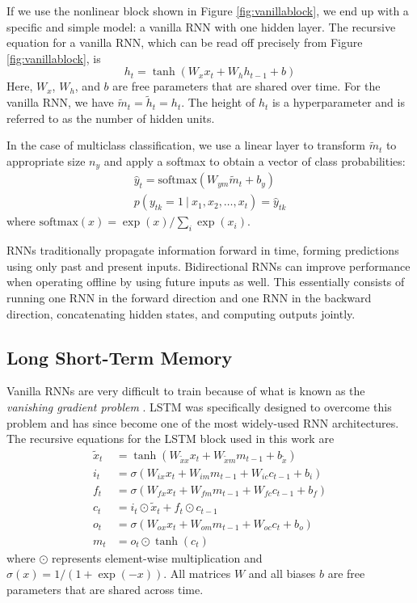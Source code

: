 \documentclass{llncs}
\begin{document}
If we use the nonlinear block shown in Figure \ref{fig:vanillablock}, we end up with a specific and simple model: a vanilla RNN with one hidden layer. The recursive equation for a vanilla RNN, which can be read off precisely from Figure \ref{fig:vanillablock}, is
\begin{equation}
	h_t = \tanh(W_x x_t + W_h h_{t-1} + b) \label{eq:vanillarnn}
\end{equation}
Here, $W_x$, $W_h$, and $b$ are free parameters that are shared over time. For the vanilla RNN, we have $\tilde{m}_t = \tilde{h}_t = h_t$. The height of $h_t$ is a hyperparameter and is referred to as the number of hidden units.

In the case of multiclass classification, we use a linear layer to transform $\tilde{m}_t$ to appropriate size $n_y$ and apply a softmax to obtain a vector of class probabilities:
\begin{gather}
	\hat{y}_t = \mbox{softmax}(W_{ym} \tilde{m}_t + b_y) \label{eq:logits} \\
	p(y_{tk} = 1~|~x_1, x_2, \ldots, x_t) = \hat{y}_{tk} \label{eq:prob}
\end{gather}
where $\mbox{softmax}(x) = \exp(x) \label{eq:softmax} / \sum_i \exp(x_i)$.

RNNs traditionally propagate information forward in time, forming predictions using only past and present inputs. Bidirectional RNNs \cite{schuster1997bidirectional} can improve performance when operating offline by using future inputs as well. This essentially consists of running one RNN in the forward direction and one RNN in the backward direction, concatenating hidden states, and computing outputs jointly.

\subsection{Long Short-Term Memory}

Vanilla RNNs are very difficult to train because of what is known as the \emph{vanishing gradient problem} \cite{bengio1994learning}. LSTM \cite{hochreiter1997long} was specifically designed to overcome this problem and has since become one of the most widely-used RNN architectures. The recursive equations for the LSTM block used in this work are
\begin{align}
	\tilde{x}_t &= \tanh(W_{\tilde{x}x} x_t + W_{\tilde{x}m} m_{t-1} + b_{\tilde{x}}) \\
	i_t &= \sigma(W_{ix} x_t + W_{im} m_{t-1} + W_{ic} c_{t-1} + b_i) \\
	f_t &= \sigma(W_{fx} x_t + W_{fm} m_{t-1} + W_{fc} c_{t-1} + b_f) \\
	c_t &= i_t \odot \tilde{x}_t + f_t \odot c_{t-1} \\
	o_t &= \sigma(W_{ox} x_t + W_{om} m_{t-1} + W_{oc} c_t + b_o) \\
	m_t &= o_t \odot \tanh(c_t)
\end{align}
where $\odot$ represents element-wise multiplication and $\sigma(x) = 1 / (1+\exp(-x))$. All matrices $W$ and all biases $b$ are free parameters that are shared across time.
\end{document}
